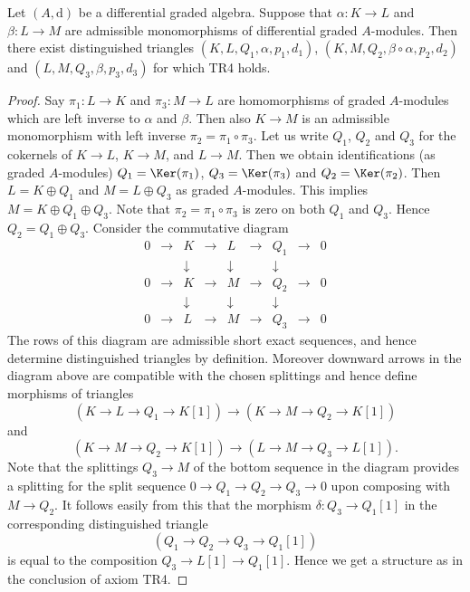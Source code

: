 \begin{lemma}
\label{lemma-two-split-injections}
Let $(A, \text{d})$ be a differential graded algebra. Suppose that
$\alpha : K \to L$ and $\beta : L \to M$ are admissible monomorphisms
of differential graded $A$-modules. Then there exist distinguished triangles
$(K, L, Q_1, \alpha, p_1, d_1)$, $(K, M, Q_2, \beta \circ \alpha, p_2, d_2)$
and $(L, M, Q_3, \beta, p_3, d_3)$ for which TR4 holds.
\end{lemma}

\begin{proof}
Say $\pi_1 : L \to K$ and $\pi_3 : M \to L$ are homomorphisms
of graded $A$-modules which are left inverse to $\alpha$ and $\beta$.
Then also $K \to M$ is an admissible monomorphism with left
inverse $\pi_2 = \pi_1 \circ \pi_3$. Let us write $Q_1$, $Q_2$
and $Q_3$ for the cokernels of $K \to L$, $K \to M$, and $L \to M$.
Then we obtain identifications (as graded $A$-modules)
$Q_1 = \Ker(\pi_1)$, $Q_3 = \Ker(\pi_3)$ and
$Q_2 = \Ker(\pi_2)$. Then $L = K \oplus Q_1$ and
$M = L \oplus Q_3$ as graded $A$-modules. This implies
$M = K \oplus Q_1 \oplus Q_3$. Note that $\pi_2 = \pi_1 \circ \pi_3$
is zero on both $Q_1$ and $Q_3$. Hence $Q_2 = Q_1 \oplus Q_3$.
Consider the commutative diagram
$$
\begin{matrix}
0 & \to & K & \to & L & \to & Q_1 & \to & 0 \\
  &     & \downarrow &     & \downarrow &     & \downarrow  & \\
0 & \to & K & \to & M & \to & Q_2 & \to & 0 \\
  &     & \downarrow &     & \downarrow &     & \downarrow  & \\
0 & \to & L & \to & M & \to & Q_3 & \to & 0
\end{matrix}
$$
The rows of this diagram are admissible short exact sequences, and
hence determine distinguished triangles by definition. Moreover
downward arrows in the diagram above are compatible with the chosen
splittings and hence define morphisms of triangles
$$
(K \to L \to Q_1 \to K[1])
\longrightarrow
(K \to M \to Q_2 \to K[1])
$$
and
$$
(K \to M \to Q_2 \to K[1])
\longrightarrow
(L \to M \to Q_3 \to L[1]).
$$
Note that the splittings $Q_3 \to M$ of the bottom sequence in the
diagram provides a splitting for the split sequence
$0 \to Q_1 \to Q_2 \to Q_3 \to 0$ upon composing with $M \to Q_2$.
It follows easily from this that the morphism $\delta : Q_3 \to Q_1[1]$
in the corresponding distinguished triangle
$$
(Q_1 \to Q_2 \to Q_3 \to Q_1[1])
$$
is equal to the composition $Q_3 \to L[1] \to Q_1[1]$.
Hence we get a structure as in the conclusion of axiom TR4.
\end{proof}

